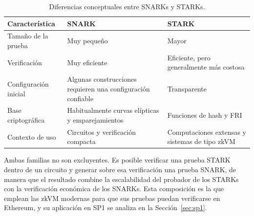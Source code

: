 \begin{table}[htbp]
	\centering
	\caption{Diferencias conceptuales entre SNARKs y STARKs.}
	\label{tab:snark_stark}
	\small
	\begin{tabular}{>{\raggedright\arraybackslash}p{3.6cm} >{\raggedright\arraybackslash}p{5.3cm} >{\raggedright\arraybackslash}p{5.3cm}}
		\toprule
		\textbf{Característica} & \textbf{SNARK} & \textbf{STARK} \\
		\midrule
		Tamaño de la prueba & Muy pequeño & Mayor \\
		\addlinespace
		Verificación & Muy eficiente & Eficiente, pero generalmente más costosa \\
		\addlinespace
		Configuración inicial & Algunas construcciones requieren una configuración confiable &
		Transparente \\
		\addlinespace
		Base criptográfica & Habitualmente curvas elípticas y emparejamientos & Funciones de hash
		y FRI \\
		\addlinespace
		Contexto de uso & Circuitos y verificación compacta & Computaciones extensas y sistemas de
		tipo zkVM \\
		\bottomrule
	\end{tabular}
\end{table}

Ambas familias no son excluyentes. Es posible verificar una prueba STARK dentro de un circuito y
generar sobre esa verificación una prueba SNARK, de manera que el resultado combine la
escalabilidad del probador de los STARKs con la verificación económica de los SNARKs. Esta
composición es la que emplean las zkVM modernas para que sus pruebas puedan verificarse en
Ethereum, y su aplicación en SP1 se analiza en la Sección~\ref{sec:sp1}.

